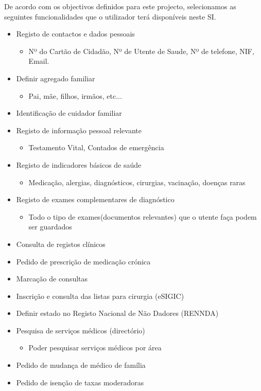 \documentclass[12pt, a4paper, twoside]{report} %
\begin{document}
De acordo com os objectivos definidos para este projecto, selecionamos as seguintes funcionalidades que o utilizador terá disponíveis neste SI.

\begin{itemize}

\item Registo de contactos e dados pessoais
\begin{itemize}
\item Nº do Cartão de Cidadão, Nº de Utente de Saude, Nº de telefone, NIF, Email.
\end{itemize}
\item Definir agregado familiar
\begin{itemize}
\item Pai, mãe, filhos, irmãos, etc...
\end{itemize} 
\item Identificação de cuidador familiar
\item Registo de informação pessoal relevante
\begin{itemize}
\item Testamento Vital, Contados de emergência
\end{itemize}
\item Registo de indicadores básicos de saúde
\begin{itemize}
\item Medicação, alergias, diagnósticos, cirurgias, vacinação, doenças raras
\end{itemize}
\item Registo de exames complementares de diagnóstico
\begin{itemize}
\item Todo o tipo de exames(documentos relevantes) que o utente faça podem ser guardados
\end{itemize}
\item Consulta de registos clínicos
\item Pedido de prescrição de medicação crónica
\item Marcação de consultas
\item Inscrição e consulta das listas para cirurgia (eSIGIC)
\item Definir estado no Registo Nacional de Não Dadores (RENNDA)
\item Pesquisa de serviços médicos (directório)
\begin{itemize}
\item Poder pesquisar serviços médicos por área
\end{itemize}
\item Pedido de mudança de médico de família
\item Pedido de isenção de taxas moderadoras

\end{itemize}
\end{document}
